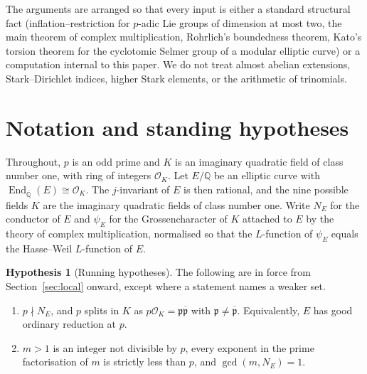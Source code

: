 \documentclass[11pt]{article}
\theoremstyle{definition}
\newtheorem{hypothesis}[theorem]{Hypothesis}
\theoremstyle{remark}
\newcommand{\Q}{\mathbb{Q}}
\newcommand{\End}{\operatorname{End}}
\newcommand{\pp}{\mathfrak{p}}
\newcommand{\ppb}{\overline{\mathfrak{p}}}
\newcommand{\cO}{\mathcal{O}}
\begin{document}
The arguments are arranged so that every input is either a standard structural fact (inflation--restriction for \(p\)-adic Lie groups of dimension at most two, the main theorem of complex multiplication, Rohrlich's boundedness theorem, Kato's torsion theorem for the cyclotomic Selmer group of a modular elliptic curve) or a computation internal to this paper. We do not treat almost abelian extensions, Stark--Dirichlet indices, higher Stark elements, or the arithmetic of trinomials.

\section{Notation and standing hypotheses}
\label{sec:notation}

Throughout, \(p\) is an odd prime and \(K\) is an imaginary quadratic field of class number one, with ring of integers \(\cO_K\). Let \(E/\Q\) be an elliptic curve with \(\End_{\overline{\Q}}(E)\cong\cO_K\). The \(j\)-invariant of \(E\) is then rational, and the nine possible fields \(K\) are the imaginary quadratic fields of class number one. Write \(N_E\) for the conductor of \(E\) and \(\psi_E\) for the Grossencharacter of \(K\) attached to \(E\) by the theory of complex multiplication, normalised so that the \(L\)-function of \(\psi_E\) equals the Hasse--Weil \(L\)-function of \(E\).

\begin{hypothesis}[Running hypotheses]
\label{hyp:run}
The following are in force from Section~\ref{sec:local} onward, except where a statement names a weaker set.
\begin{enumerate}[label=\textup{(\roman*)}]
\item \(p\nmid N_E\), and \(p\) splits in \(K\) as \(p\cO_K=\pp\ppb\) with \(\pp\neq\ppb\). Equivalently, \(E\) has good ordinary reduction at \(p\).
\item \(m>1\) is an integer not divisible by \(p\), every exponent in the prime factorisation of \(m\) is strictly less than \(p\), and \(\gcd(m,N_E)=1\).
\end{enumerate}
\end{hypothesis}
\end{document}
